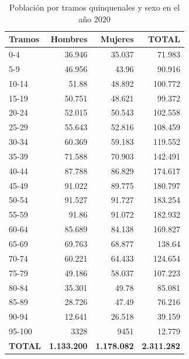 \begin{table}[H]
    \centering
    \begin{tabular}{lrrr}
        \toprule
        Tramos & Hombres   & Mujeres   & TOTAL     \\
        \midrule
        0-4    & 36.946    & 35.037    & 71.983    \\
        5-9    & 46.956    & 43.96     & 90.916    \\
        10-14  & 51.88     & 48.892    & 100.772   \\
        15-19  & 50.751    & 48.621    & 99.372    \\
        20-24  & 52.015    & 50.543    & 102.558   \\
        25-29  & 55.643    & 52.816    & 108.459   \\
        30-34  & 60.369    & 59.183    & 119.552   \\
        35-39  & 71.588    & 70.903    & 142.491   \\
        40-44  & 87.788    & 86.829    & 174.617   \\
        45-49  & 91.022    & 89.775    & 180.797   \\
        50-54  & 91.527    & 91.727    & 183.254   \\
        55-59  & 91.86     & 91.072    & 182.932   \\
        60-64  & 85.689    & 84.138    & 169.827   \\
        65-69  & 69.763    & 68.877    & 138.64    \\
        70-74  & 60.221    & 64.433    & 124.654   \\
        75-79  & 49.186    & 58.037    & 107.223   \\
        80-84  & 35.301    & 49.78     & 85.081    \\
        85-89  & 28.726    & 47.49     & 76.216    \\
        90-94  & 12.641    & 26.518    & 39.159    \\
        95-100 & 3328      & 9451      & 12.779    \\
        \textbf{TOTAL}  & \textbf{1.133.200} & \textbf{1.178.082} & \textbf{2.311.282}  \\
        \bottomrule
        \end{tabular}
        \caption{Población por tramos quinquenales y sexo en el año 2020}
\end{table}

